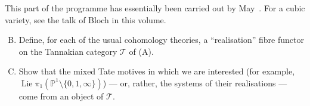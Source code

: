 \documentclass{article}
\theoremstyle{plain}
\theoremstyle{definition}
\newcommand{\sh}[1]{{\mathscr{#1}}}
\newcommand{\PP}{\mathbb{P}}
\DeclareMathOperator{\Lie}{Lie}
\begin{document}
This part of the programme has essentially been carried out by May~\cite{26}.
For a cubic variety, see the talk of Bloch in this volume.

\begin{enumerate}[(A)]
\setcounter{enumi}{1}
  \item Define, for each of the usual cohomology theories, a ``realisation'' fibre functor on the Tannakian category $\sh{T}$ of (A).
  \item Show that the mixed Tate motives in which we are interested (for example, $\Lie\pi_1(\PP^1\setminus\{0,1,\infty\})$) --- or, rather, the systems of their realisations --- come from an object of $\sh{T}$.
\end{enumerate}



\nocite{*}
\end{document}
